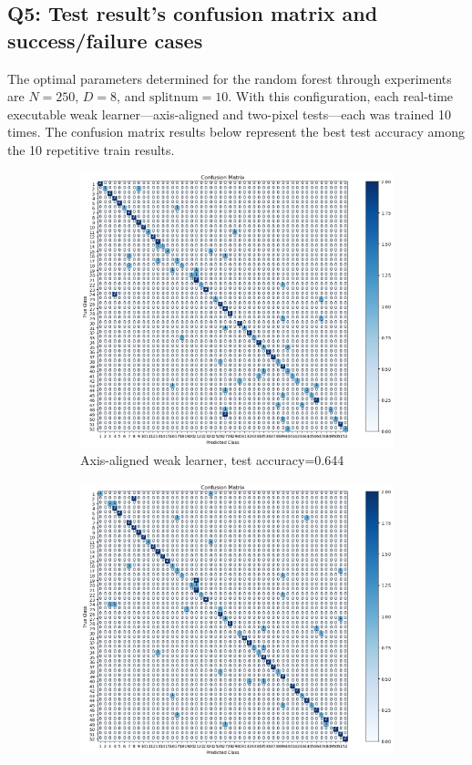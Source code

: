 \subsection{Q5: Test result's confusion matrix and success/failure cases }
\label{subsec:Q5-1}
The optimal parameters determined for the random forest through experiments are $N=250$, $D=8$, and $\text{splitnum}=10$. With this configuration, each real-time executable weak learner—axis-aligned and two-pixel tests—each was trained 10 times. The confusion matrix results below represent the best test accuracy among the 10 repetitive train results.

\begin{figure}[h]
	\centering
	\begin{subfigure}[t]{0.4\linewidth}
		\centering
		\includegraphics[width=\linewidth]{image/q5-fig6.png}
		\caption{Axis-aligned weak learner, test accuracy=0.644}
		\label{fig:q5-fig6}
	\end{subfigure}%
	\quad
	\begin{subfigure}[t]{0.4\linewidth}
		\centering
		\includegraphics[width=\linewidth]{image/q5-fig8.png}

\end{subfigure}
\end{figure}
